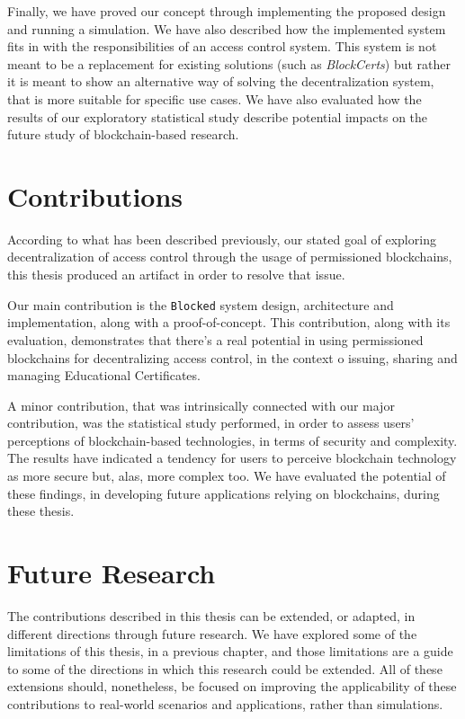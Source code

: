 Finally, we have proved our concept through implementing the proposed design and running a simulation. We have also described how the implemented system fits in with the responsibilities of an access control system. This system is not meant to be a replacement for existing solutions (such as \emph{BlockCerts}) but rather it is meant to show an alternative way of solving the decentralization system, that is more suitable for specific use cases. We have also evaluated how the results of our exploratory statistical study describe potential impacts on the future study of blockchain-based research.

\section{Contributions}

According to what has been described previously, our stated goal of exploring decentralization of access control through the usage of permissioned blockchains, this thesis produced an artifact in order to resolve that issue.

Our main contribution is the \texttt{Blocked} system design, architecture and implementation, along with a proof-of-concept. This contribution, along with its evaluation, demonstrates that there's a real potential in using permissioned blockchains for decentralizing access control, in the context o issuing, sharing and managing Educational Certificates.

A minor contribution, that was intrinsically connected with our major contribution, was the statistical study performed, in order to assess users' perceptions of blockchain-based technologies, in terms of security and complexity. The results have indicated a tendency for users to perceive blockchain technology as more secure but, alas, more complex too. We have evaluated the potential of these findings, in developing future applications relying on blockchains, during these thesis.

\section{Future Research}

The contributions described in this thesis can be extended, or adapted, in different directions through future research. We have explored some of the limitations of this thesis, in a previous chapter, and those limitations are a guide to some of the directions in which this research could be extended. All of these extensions should, nonetheless, be focused on improving the applicability of these contributions to real-world scenarios and applications, rather than simulations.

